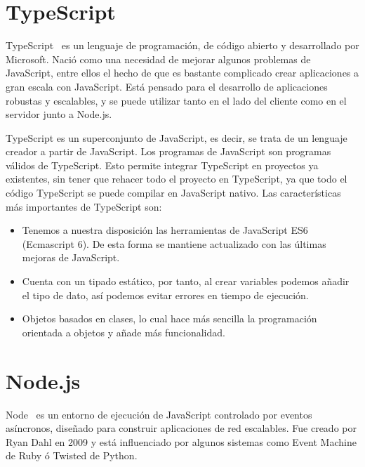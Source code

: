 \documentclass[a4paper, 12pt]{book}
\begin{document}
\section{TypeScript} 
\label{sec:typescript}

TypeScript~\cite{typescript} es un lenguaje de programación, de código abierto y desarrollado por Microsoft.
Nació como una necesidad de mejorar algunos problemas de JavaScript, entre ellos el hecho de que es bastante complicado crear aplicaciones a gran escala con JavaScript. Está pensado para el desarrollo de aplicaciones robustas y escalables, y se puede utilizar tanto en el lado del cliente como en el servidor junto a Node.js.

TypeScript es un superconjunto de JavaScript, es decir, se trata de un lenguaje creador a partir de JavaScript. Los programas de JavaScript son programas válidos de TypeScript. Esto permite integrar TypeScript en proyectos ya existentes, sin tener que rehacer todo el proyecto en TypeScript, ya que todo el código TypeScript se puede compilar en JavaScript nativo.
Las características más importantes de TypeScript son:

\begin{itemize}

	\item Tenemos a nuestra disposición las herramientas de JavaScript ES6 (Ecmascript 6). De esta forma se mantiene actualizado con las últimas mejoras de JavaScript.

	\item Cuenta con un tipado estático, por tanto, al crear variables podemos añadir el tipo de dato, así podemos evitar errores en tiempo de ejecución.

	\item Objetos basados en clases, lo cual hace más sencilla la programación orientada a objetos y añade más funcionalidad.

\end{itemize}

\section{Node.js} 
\label{sec:nodejs}

Node~\cite{nodejs} es un entorno de ejecución de JavaScript controlado por eventos asíncronos, diseñado para construir aplicaciones de red escalables.
Fue creado por Ryan Dahl en 2009 y está influenciado por algunos sistemas como Event Machine de Ruby ó Twisted de Python.
\end{document}
